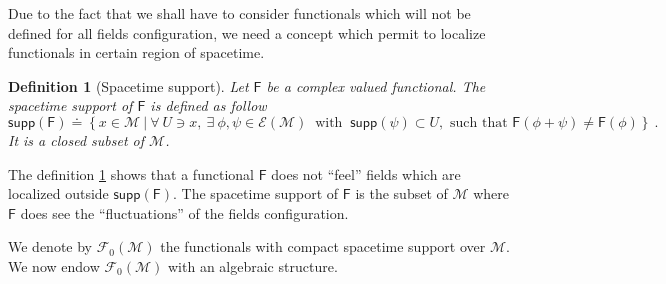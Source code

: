 \documentclass[10pt]{book}
\newcommand{\supp}{\mathsf{supp}}
\newcommand{\Ecal}{\mathcal{E}}
\newcommand{\Fcal}{\mathcal{F}}
\newcommand{\Mcal}{\mathcal{M}}
\newcommand{\Fsf}{\mathsf{F}}
\theoremstyle{break}
\newtheorem{definition}{Definition}
\begin{document}
\bigskip


Due to the fact that we shall have to consider functionals which will not be defined for all fields configuration, we need a concept which permit to localize functionals in certain region of spacetime.


\begin{definition}[Spacetime support] \label{def:spacetime_supp}
Let $\Fsf$ be a complex valued functional. The spacetime support of $\Fsf$ is defined as follow
%
\begin{equation*}
\supp(\Fsf) \doteq \left\{ x \in \Mcal \ \bigg| \ 
\forall \ U \ni x , \ \exists \ \phi, \psi \in \Ecal(\Mcal) \ \mbox{ with } \ \supp(\psi) \subset U, \mbox{ such that } \Fsf(\phi + \psi) \neq \Fsf(\phi)
\right\} \ .
\end{equation*}
It is a closed subset of $\Mcal$.
%
\end{definition}


The definition \ref{def:spacetime_supp} shows that a functional $\Fsf$ does not ``feel'' fields which are localized outside $\supp(\Fsf)$. The spacetime support of $\Fsf$ is the subset of $\Mcal$ where $\Fsf$ does see the ``fluctuations'' of the fields configuration.




\bigskip


We denote by $\Fcal_0(\Mcal)$ the functionals with compact spacetime support over $\Mcal$. We now endow $\Fcal_0(\Mcal)$ with an algebraic structure. 
\end{document}
